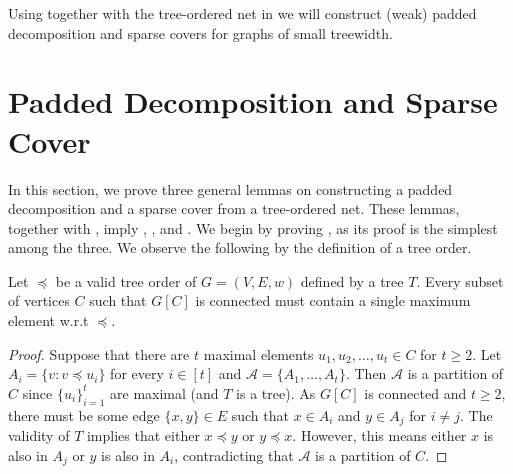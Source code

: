 \documentclass{theoretics}
\begin{document}
Using  together with the tree-ordered net in  we will construct (weak) padded decomposition and sparse covers for graphs of small treewidth. 

\section{Padded Decomposition and Sparse Cover}\label{sec:centersToPadded}

In this section, we prove three general lemmas on constructing a padded decomposition and a sparse cover from a tree-ordered net. These lemmas, together with , imply , , and . We begin by proving , as its proof is the simplest among the three. We observe the following by the definition of a tree order.

\begin{observation}\label{obs:maximal} Let $\preceq$ be a valid tree order of $G = (V,E,w)$ defined by a tree $T$. Every subset of vertices $C$ such that $G[C]$ is connected must contain a single maximum element w.r.t $\preceq$.
\end{observation}
\begin{proof}
	Suppose that there are $t$ maximal elements $u_1,u_2,\ldots, u_t\in C$ for $t\geq 2$. Let  $A_i = \{v: v\preceq u_i\}$ for every $i\in [t]$ and  $\mathcal{A} = \{A_1,\ldots, A_t\}$. Then $\mathcal{A}$ is a partition of $C$ since $\{u_i\}_{i=1}^t$ are maximal (and $T$ is a tree). As $G[C]$ is connected and $t\geq 2$, there must be some edge $\{x,y\}\in E$ such that $x\in A_i$ and $y\in A_j$ for $i\not= j$. The validity of $T$ implies that either $x\preceq y$ or $y\preceq x$. However, this means either $x$ is also in $A_j$ or $y$ is also in $A_i$, contradicting that $\mathcal{A}$ is a partition of $C$. 
\end{proof}
\end{document}
